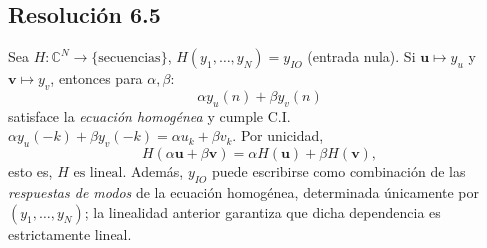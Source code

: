 \documentclass[
  11pt,
  letterpaper,
   addpoints,
  ]{exam}
\begin{document}
\begin{questions}
\begin{solution}
\subsection*{Resolución 6.5}
Sea $H:\mathbb C^N\to\{\text{secuencias}\}$, $H(y_1,\dots,y_N)=y_{IO}$ (entrada nula).
Si $\mathbf u\mapsto y_u$ y $\mathbf v\mapsto y_v$, entonces para $\alpha,\beta$:
\begin{equation}
  \alpha y_u(n)+\beta y_v(n)
\end{equation}
satisface la \emph{ecuación homogénea} y cumple C.I.
\(
  \alpha y_u(-k)+\beta y_v(-k)=\alpha u_k+\beta v_k
\).
Por unicidad,
\begin{equation}
  H(\alpha \mathbf u+\beta \mathbf v)=\alpha H(\mathbf u)+\beta H(\mathbf v),
\end{equation}
esto es, \(\boxed{H \text{ es lineal}.}\)
Además, $y_{IO}$ puede escribirse como combinación de las \emph{respuestas de modos} de la ecuación homogénea, determinada únicamente por $(y_1,\dots,y_N)$; la linealidad anterior garantiza que dicha dependencia es estrictamente lineal.

\end{solution}




\end{questions}
\end{document}

